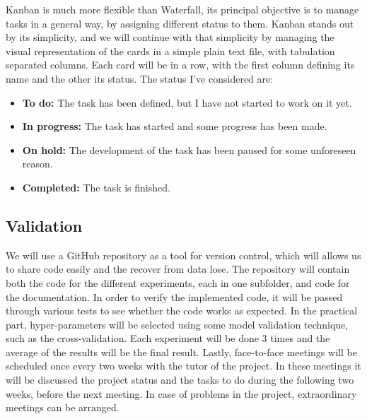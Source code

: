 Kanban is much more flexible than Waterfall, its principal objective is to manage tasks in a general way, by assigning different status to them. Kanban stands out by its simplicity, and we will continue with that simplicity by managing the visual representation of the cards in a simple plain text file, with tabulation separated columns. Each card will be in a row, with the first column defining its name and the other its status. The status I've considered are:

\begin{itemize}
    \item \textbf{To do:} The task has been defined, but I have not started to work on it yet.
    \item \textbf{In progress:} The task has started and some progress has been made.
    \item \textbf{On hold:} The development of the task has been paused for some unforeseen reason.
    \item \textbf{Completed:} The task is finished.
\end{itemize}

\subsection{Validation}

We will use a GitHub repository as a tool for version control, which will allows us to share code easily and the recover from data lose. The repository will contain both the code for the different experiments, each in one subfolder, and code for the documentation. In order to verify the implemented code, it will be passed through various tests to see whether the code works as expected. In the practical part, hyper-parameters will be selected using some model validation technique, such as the cross-validation. Each experiment will be done 3 times and the average of the results will be the final result. Lastly, face-to-face meetings will be scheduled once every two weeks with the tutor of the project. In these meetings it will be discussed the project status and the tasks to do during the following two weeks, before the next meeting. In case of problems in the project, extraordinary meetings can be arranged.

